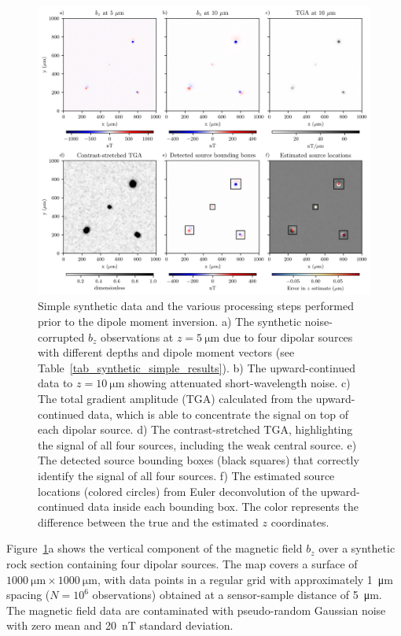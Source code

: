 \begin{figure}[tb!]
  \centering
  \includegraphics[width=1\linewidth]{figures/simple-synthetic-data.png}
  \caption{
    Simple synthetic data and the various processing steps performed prior to the dipole moment inversion.
    a) The synthetic noise-corrupted $b_z$ observations at
    $z = \qty{5}{\micro\meter}$ due to four dipolar sources with different
    depths and dipole moment vectors
    (see Table~\ref{tab_synthetic_simple_results}).
    b) The upward-continued data to $z = \qty{10}{\micro\meter}$ showing
    attenuated short-wavelength noise.
    c) The total gradient amplitude (TGA) calculated from the
    upward-continued data, which is able to concentrate the signal on top
    of each dipolar source.
    d) The contrast-stretched TGA, highlighting the signal of all four
    sources, including the weak central source.
    e) The detected source bounding boxes (black squares) that correctly
    identify the signal of all four sources.
    f) The estimated source locations (colored circles) from Euler
    deconvolution of the upward-continued data inside each bounding box.
    The color represents the difference between the true and the estimated
    $z$ coordinates.
  }
  \label{fig_synthetic_simple_data}
\end{figure}

Figure~\ref{fig_synthetic_simple_data}a shows the vertical component of the magnetic field $b_z$ over a synthetic rock section containing four dipolar sources.
The map covers a surface of $\qty{1000}{\um} \times \qty{1000}{\um}$, with data points in a regular grid with approximately \qty{1}{\um} spacing ($N = 10^6$ observations) obtained at a sensor-sample distance of \qty{5}{\um}.
The magnetic field data are contaminated with pseudo-random Gaussian noise with zero mean and \qty{20}{\nano\tesla} standard deviation.

